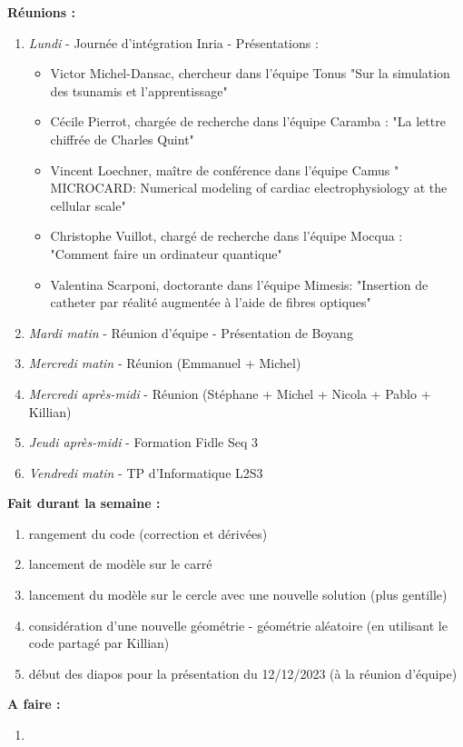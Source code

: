 \textbf{Réunions :}
\begin{enumerate}[label=\textbullet]
	\item \textit{Lundi} - Journée d'intégration Inria - Présentations :
	\begin{itemize}
		\item Victor Michel-Dansac, chercheur dans l'équipe Tonus "Sur la simulation des tsunamis et l'apprentissage"
		\item Cécile Pierrot, chargée de recherche dans l'équipe Caramba : "La lettre chiffrée de Charles Quint"
		\item Vincent Loechner, maître de conférence dans l'équipe Camus " MICROCARD: Numerical modeling of cardiac electrophysiology at the cellular scale"
		\item Christophe Vuillot, chargé de recherche dans l'équipe Mocqua : "Comment faire un ordinateur quantique"
		\item Valentina Scarponi, doctorante dans l'équipe Mimesis: "Insertion de catheter par réalité augmentée à l'aide de fibres optiques"
	\end{itemize}
	\item \textit{Mardi matin} - Réunion d'équipe - Présentation de Boyang
	\item \textit{Mercredi matin} - Réunion (Emmanuel + Michel)
	\item \textit{Mercredi après-midi} - Réunion (Stéphane + Michel + Nicola + Pablo + Killian)
	\item \textit{Jeudi après-midi} - Formation Fidle Seq 3
	\item \textit{Vendredi matin} - TP d'Informatique L2S3
\end{enumerate}
\textbf{Fait durant la semaine :}
\begin{enumerate}[label=\textbullet]
	\item rangement du code (correction et dérivées)
	\item lancement de modèle sur le carré
	\item lancement du modèle sur le cercle avec une nouvelle solution (plus gentille)
	\item considération d'une nouvelle géométrie - géométrie aléatoire (en utilisant le code partagé par Killian)
	\item début des diapos pour la présentation du 12/12/2023 (à la réunion d'équipe)
\end{enumerate}
\textbf{A faire :}
\begin{enumerate}[label=\textbullet]
	\item 
\end{enumerate}